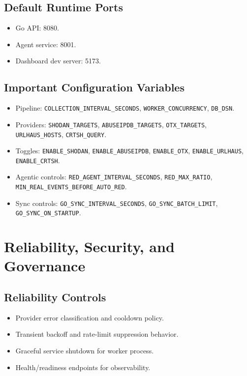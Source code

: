 \documentclass[11pt,a4paper]{article}
\begin{document}
\subsection{Default Runtime Ports}
\begin{itemize}[leftmargin=1.5em]
  \item Go API: 8080.
  \item Agent service: 8001.
  \item Dashboard dev server: 5173.
\end{itemize}

\subsection{Important Configuration Variables}
\begin{itemize}[leftmargin=1.5em]
  \item Pipeline: \texttt{COLLECTION\_INTERVAL\_SECONDS}, \texttt{WORKER\_CONCURRENCY}, \texttt{DB\_DSN}.
  \item Providers: \texttt{SHODAN\_TARGETS}, \texttt{ABUSEIPDB\_TARGETS}, \texttt{OTX\_TARGETS}, \texttt{URLHAUS\_HOSTS}, \texttt{CRTSH\_QUERY}.
  \item Toggles: \texttt{ENABLE\_SHODAN}, \texttt{ENABLE\_ABUSEIPDB}, \texttt{ENABLE\_OTX}, \texttt{ENABLE\_URLHAUS}, \texttt{ENABLE\_CRTSH}.
  \item Agentic controls: \texttt{RED\_AGENT\_INTERVAL\_SECONDS}, \texttt{RED\_MAX\_RATIO}, \texttt{MIN\_REAL\_EVENTS\_BEFORE\_AUTO\_RED}.
  \item Sync controls: \texttt{GO\_SYNC\_INTERVAL\_SECONDS}, \texttt{GO\_SYNC\_BATCH\_LIMIT}, \texttt{GO\_SYNC\_ON\_STARTUP}.
\end{itemize}

\section{Reliability, Security, and Governance}
\subsection{Reliability Controls}
\begin{itemize}[leftmargin=1.5em]
  \item Provider error classification and cooldown policy.
  \item Transient backoff and rate-limit suppression behavior.
  \item Graceful service shutdown for worker process.
  \item Health/readiness endpoints for observability.
\end{itemize}
\end{document}
